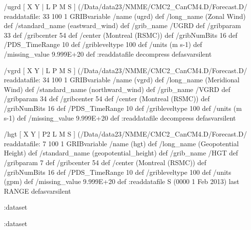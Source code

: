 \begin{ingrid}
/ugrd {
[ X Y | L P M S ] (/Data/data23/NMME/CMC2_CanCM4.D/Forecast.D/%
readdatafile:
33 100 1 GRIBvariable 
/name (ugrd) def
/long_name (Zonal Wind) def
/standard_name (eastward_wind) def
/grib_name /UGRD def
/gribparam 33 def
/gribcenter 54 def
/center (Montreal (RSMC)) def
/gribNumBits 16 def
/PDS_TimeRange 10 def
/gribleveltype 100 def
/units (m s-1) def
/missing_value 9.999E+20 def
:readdatafile decompress
} defasvarsilent

/vgrd {
[ X Y | L P M S ] (/Data/data23/NMME/CMC2_CanCM4.D/Forecast.D/%
readdatafile:
34 100 1 GRIBvariable 
/name (vgrd) def
/long_name (Meridional Wind) def
/standard_name (northward_wind) def
/grib_name /VGRD def
/gribparam 34 def
/gribcenter 54 def
/center (Montreal (RSMC)) def
/gribNumBits 16 def
/PDS_TimeRange 10 def
/gribleveltype 100 def
/units (m s-1) def
/missing_value 9.999E+20 def
:readdatafile decompress
} defasvarsilent

/hgt {
[ X Y | P2 L M S ] (/Data/data23/NMME/CMC2_CanCM4.D/Forecast.D/%
readdatafile:
7 100 1 GRIBvariable 
/name (hgt) def
/long_name (Geopotential Height) def
/standard_name (geopotential_height) def
/grib_name /HGT def
/gribparam 7 def
/gribcenter 54 def
/center (Montreal (RSMC)) def
/gribNumBits 16 def
/PDS_TimeRange 10 def
/gribleveltype 100 def
/units (gpm) def
/missing_value 9.999E+20 def
:readdatafile
S (0000 1 Feb 2013) last RANGE
} defasvarsilent

:dataset

:dataset
\end{ingrid}
